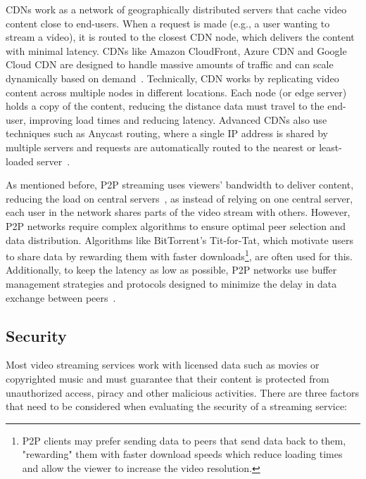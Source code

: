 \ac{CDN}s work as a network of geographically distributed servers that cache video content close to end-users. When a request is made (e.g., a user wanting to stream a video), it is routed to the closest \ac{CDN} node, which delivers the content with minimal latency. \ac{CDN}s like Amazon CloudFront, Azure CDN and Google Cloud CDN are designed to handle massive amounts of traffic and can scale dynamically based on demand~\parencite{cdn_basic}.
Technically, \ac{CDN} works by replicating video content across multiple nodes in different locations. Each node (or edge server) holds a copy of the content, reducing the distance data must travel to the end-user, improving load times and reducing latency. Advanced \ac{CDN}s also use techniques such as Anycast routing, where a single IP address is shared by multiple servers and requests are automatically routed to the nearest or least-loaded server~\parencite{cdn_basic}.
    
As mentioned before, \ac{P2P} streaming uses viewers' bandwidth to deliver content, reducing the load on central servers~\parencite{cdn_basic}, as instead of relying on one central server, each user in the network shares parts of the video stream with others.
However, \ac{P2P} networks require complex algorithms to ensure optimal peer selection and data distribution. Algorithms like BitTorrent's Tit-for-Tat, which motivate users to share data by rewarding them with faster downloads\footnote{\ac{P2P} clients may prefer sending data to peers that send data back to them, "rewarding" them with faster download speeds which reduce loading times and allow the viewer to increase the video resolution.}, are often used for this. Additionally, to keep the latency as low as possible, \ac{P2P} networks use buffer management strategies and protocols designed to minimize the delay in data exchange between peers~\parencite{p2p}.

\subsection{Security}

Most video streaming services work with licensed data such as movies or copyrighted music and must guarantee that their content is protected from unauthorized access, piracy and other malicious activities.
There are three factors that need to be considered when evaluating the security of a streaming service: 

